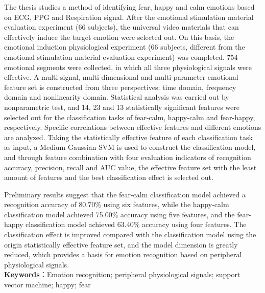 The thesis studies a method of identifying fear, happy and calm emotions based on ECG, PPG and Respiration signal. After the emotional stimulation material evaluation experiment (66 subjects), the universal video materials that can effectively induce the target emotion were selected out. On this basis, the emotional induction physiological experiment (66 subjects, different from the emotional stimulation material evaluation experiment) was completed. 754 emotional segments were collected, in which all three physiological signals were effective. A multi-signal, multi-dimensional and multi-parameter emotional feature set is constructed from three perspectives: time domain, frequency domain and nonlinearity domain. Statistical analysis was carried out by nonparametric test, and 14, 23 and 13 statistically significant features were selected out for the classification tasks of fear-calm, happy-calm and fear-happy, respectively. Specific correlations between effective features and different emotions are analyzed. Taking the statistically effective feature of each classification task as input, a Medium Gaussian SVM is used to construct the classification model, and through feature combination with four evaluation indicators of recognition accuracy, precision, recall and AUC value, the effective feature set with the least amount of features and the best classification effect is selected out. 

Preliminary results suggest that the fear-calm classification model achieved a recognition accuracy of 80.70\% using six features, while the happy-calm classification model achieved 75.00\% accuracy using five features, and the fear-happy classification model achieved 63.40\% accuracy using four features. The classification effect is improved compared with the classification model using the origin statistically effective feature set, and the model dimension is greatly reduced, which provides a basis for emotion recognition based on peripheral physiological signals.
~\\

\textbf{Keywords}：Emotion recognition; peripheral physiological signals; support vector machine; happy; fear
